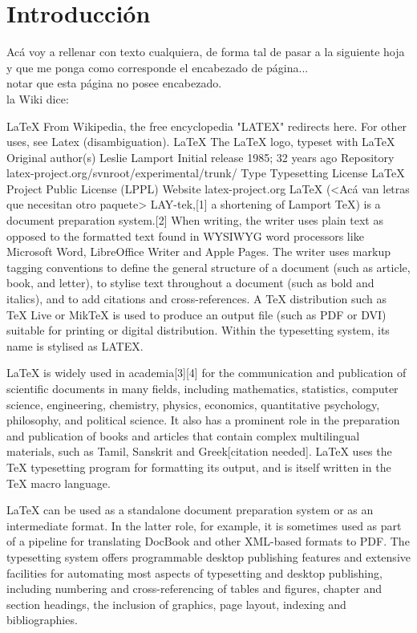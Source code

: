 \chapter{Introducción}
  Acá voy a rellenar con texto cualquiera, de forma tal de pasar a la siguiente hoja y que me ponga como corresponde el encabezado de página...\\

  notar que esta página no posee encabezado.\\

  la Wiki dice:

  LaTeX
From Wikipedia, the free encyclopedia
"LATEX" redirects here. For other uses, see Latex (disambiguation).
LaTeX
The LaTeX logo, typeset with LaTeX
Original author(s)	Leslie Lamport
Initial release	1985; 32 years ago
Repository	latex-project.org/svnroot/experimental/trunk/
Type	Typesetting
License	LaTeX Project Public License (LPPL)
Website	latex-project.org
LaTeX (<Acá van letras que necesitan otro paquete> LAY-tek,[1] a shortening of Lamport TeX) is a document preparation system.[2] When writing, the writer uses plain text as opposed to the formatted text found in WYSIWYG word processors like Microsoft Word, LibreOffice Writer and Apple Pages. The writer uses markup tagging conventions to define the general structure of a document (such as article, book, and letter), to stylise text throughout a document (such as bold and italics), and to add citations and cross-references. A TeX distribution such as TeX Live or MikTeX is used to produce an output file (such as PDF or DVI) suitable for printing or digital distribution. Within the typesetting system, its name is stylised as LATEX.

LaTeX is widely used in academia[3][4] for the communication and publication of scientific documents in many fields, including mathematics, statistics, computer science, engineering, chemistry, physics, economics, quantitative psychology, philosophy, and political science. It also has a prominent role in the preparation and publication of books and articles that contain complex multilingual materials, such as Tamil, Sanskrit and Greek[citation needed]. LaTeX uses the TeX typesetting program for formatting its output, and is itself written in the TeX macro language.

LaTeX can be used as a standalone document preparation system or as an intermediate format. In the latter role, for example, it is sometimes used as part of a pipeline for translating DocBook and other XML-based formats to PDF. The typesetting system offers programmable desktop publishing features and extensive facilities for automating most aspects of typesetting and desktop publishing, including numbering and cross-referencing of tables and figures, chapter and section headings, the inclusion of graphics, page layout, indexing and bibliographies.


